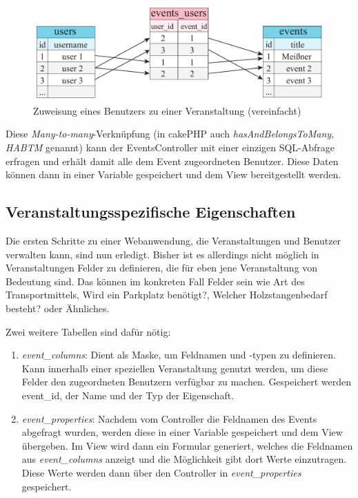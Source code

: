 \begin{figure}[!ht]
	\centering
	\includegraphics[width=15cm]{fig/events_users}
	\caption{Zuweisung eines Benutzers zu einer Veranstaltung (vereinfacht)}
\end{figure}

Diese \emph{Many-to-many}-Verknüpfung (in cakePHP auch \emph{hasAndBelongsToMany, HABTM} genannt) kann der EventsController mit einer einzigen SQL-Abfrage erfragen und erhält damit alle dem Event zugeordneten Benutzer. Diese Daten können dann in einer Variable gespeichert und dem View bereitgestellt werden.

\subsection{Veranstaltungsspezifische Eigenschaften}
Die ersten Schritte zu einer Webanwendung, die Veranstaltungen und Benutzer verwalten kann, sind nun erledigt. Bisher ist es allerdings nicht möglich in Veranstaltungen Felder zu definieren, die für eben jene Veranstaltung von Bedeutung sind. Das können im konkreten Fall Felder sein wie \glqq Art des Transportmittels\grqq{}, \glqq Wird ein Parkplatz benötigt?\grqq{}, \glqq Welcher Holzstangenbedarf besteht?\grqq{} oder Ähnliches.\par

Zwei weitere Tabellen sind dafür nötig: 

\begin{enumerate} 
	\item \emph{event\_columns}: Dient als Maske, um Feldnamen und -typen zu definieren. Kann innerhalb einer speziellen Veranstaltung genutzt werden, um diese Felder den zugeordneten Benutzern verfügbar zu machen. Gespeichert werden event\_id, der Name und der Typ der Eigenschaft.
	\item \emph{event\_properties}: Nachdem vom Controller die Feldnamen des Events abgefragt wurden, werden diese in einer Variable gespeichert und dem View übergeben. Im View wird dann ein Formular generiert, welches die Feldnamen aus \emph{event\_columns} anzeigt und die Möglichkeit gibt dort Werte einzutragen. Diese Werte werden dann über den Controller in \emph{event\_properties} gespeichert.
\end{enumerate}

